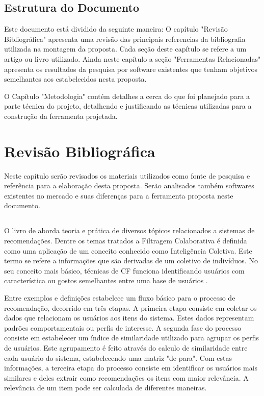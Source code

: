 \documentclass[
	12pt,				%
    oneside,			%
	a4paper,			%
	english,			%
	french,				%
	spanish,			%
	brazil,				%
	]{abntex2}
\begin{document}
\section{Estrutura do Documento}
Este documento está dividido da seguinte maneira: O capítulo "Revisão Bibliográfica" apresenta uma revisão das principais referencias da bibliografia utilizada na montagem da proposta.
Cada seção deste capítulo se refere a um artigo ou livro utilizado. Ainda neste capítulo a seção "Ferramentas Relacionadas" apresenta os resultados da pesquisa por software existentes 
que tenham objetivos semelhantes aos estabelecidos nesta proposta.

O Capítulo "Metodologia" contém detalhes a cerca do que foi planejado para a parte técnica do projeto, detalhendo e justificando as técnicas utilizadas para a construção da ferramenta
projetada.

\chapter{Revisão Bibliográfica}
Neste capítulo serão revisados os materiais utilizados como fonte de pesquisa e referência para a elaboração desta proposta. Serão analisados também softwares 
existentes no mercado e suas diferenças para a ferramenta proposta neste documento.

\section{}
O livro de  aborda teoria e prática de diversos tópicos relacionados a sistemas de recomendações. Dentre os temas tratados 
a Filtragem Colaborativa é definida como uma aplicação de um conceito conhecido como Inteligência Coletiva. Este termo se refere a informações que são derivadas
de um coletivo de indivíduos. No seu conceito mais básico, técnicas de CF funciona identificando usuários com característica ou gostos semelhantes entre uma base
de usuários \cite{1-Oreilly}.

Entre exemplos e definições  estabelece um fluxo básico para o processo de recomendação, decorrido em três etapas. A primeira etapa 
consiste em coletar os dados que relacionam os usuários aos itens do sistema. Estes dados representam padrões comportamentais ou perfis de interesse. A segunda
fase do processo consiste em estabelecer um índice de similaridade utilizado para agrupar os perfis de usuários. Este agrupamento é feito através do calculo de 
similaridade entre cada usuário do sistema, estabelecendo uma matriz "de-para". Com estas informações, a terceira etapa do processo consiste em identificar os
usuários mais similares e deles extrair como recomendações os itens com maior relevância. A relevância de um item pode ser calculada de diferentes maneiras.
\end{document}
